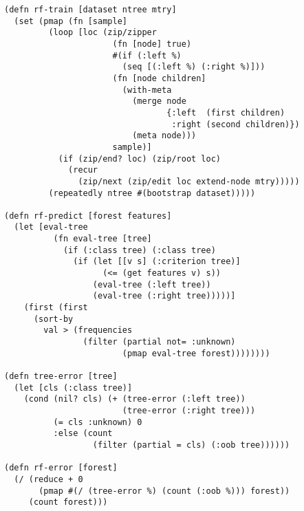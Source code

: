 \documentclass[a4paper,man,12pt,apacite,floatsintext]{apa6} %
\begin{document}
\begin{verbatim}
(defn rf-train [dataset ntree mtry]
  (set (pmap (fn [sample]
         (loop [loc (zip/zipper
                      (fn [node] true)
                      #(if (:left %)
                        (seq [(:left %) (:right %)]))
                      (fn [node children]
                        (with-meta
                          (merge node
                                 {:left  (first children)
                                  :right (second children)})
                          (meta node)))
                      sample)]
           (if (zip/end? loc) (zip/root loc)
             (recur
               (zip/next (zip/edit loc extend-node mtry)))))
         (repeatedly ntree #(bootstrap dataset)))))

(defn rf-predict [forest features]
  (let [eval-tree
          (fn eval-tree [tree]
            (if (:class tree) (:class tree)
              (if (let [[v s] (:criterion tree)]
                    (<= (get features v) s))
                  (eval-tree (:left tree))
                  (eval-tree (:right tree)))))]
    (first (first
      (sort-by
        val > (frequencies
                (filter (partial not= :unknown)
                        (pmap eval-tree forest))))))))

(defn tree-error [tree]
  (let [cls (:class tree)]
    (cond (nil? cls) (+ (tree-error (:left tree))
                        (tree-error (:right tree)))
          (= cls :unknown) 0
          :else (count
                  (filter (partial = cls) (:oob tree))))))

(defn rf-error [forest]
  (/ (reduce + 0
       (pmap #(/ (tree-error %) (count (:oob %))) forest))
     (count forest)))
\end{verbatim}


\end{document}
